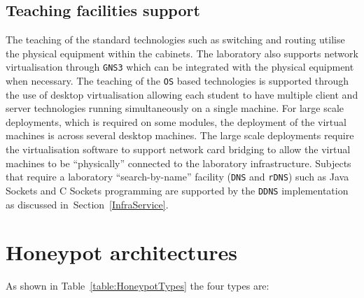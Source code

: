 \subsection{Teaching facilities support}

The teaching of the standard technologies such as switching and routing utilise
the physical equipment within the cabinets. The laboratory also supports
network virtualisation through \texttt{GNS3} which can be integrated with the
physical equipment when necessary. The teaching of the \texttt{OS} based
technologies is supported through the use of desktop virtualisation allowing
each student to have multiple client and server technologies running
simultaneously on a single machine. For large scale deployments, which is
required on some modules, the deployment of the virtual machines is across
several desktop machines. The large scale deployments require the
virtualisation software to support network card bridging to allow the virtual
machines to be ``physically'' connected to the laboratory infrastructure.
Subjects that require a laboratory ``search-by-name'' facility (\texttt{DNS} and
\texttt{rDNS}) such as Java Sockets and C Sockets programming are supported by
the \texttt{DDNS} implementation as discussed in~Section~\ref{InfraService}.

\section{Honeypot architectures}

As shown in Table~\ref{table:HoneypotTypes} the four types are:


